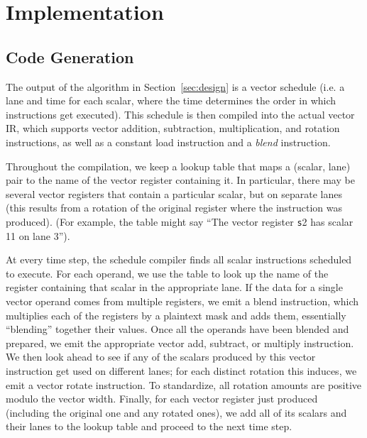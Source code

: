 \section{Implementation}\label{sec:implementation}
\subsection{Code Generation}
The output of the algorithm in Section~\ref{sec:design} is a vector schedule (i.e. a lane and time for each scalar, where the time determines the order in which instructions get executed). 
This schedule is then compiled into the actual vector IR, which supports vector addition, subtraction, multiplication, and rotation instructions, as well as a constant load instruction and a {\em blend} instruction.

Throughout the compilation, we keep a lookup table that maps a (scalar, lane) pair to the name of the vector register containing it.
In particular, there may be several vector registers that contain a particular scalar, but on separate lanes (this results from a rotation of the original register where the instruction was produced).
(For example, the table might say ``The vector register {\texttt s2} has scalar 11 on lane 3'').

At every time step, the schedule compiler finds all scalar instructions scheduled to execute.
For each operand, we use the table to look up the name of the register containing that scalar in the appropriate lane.
If the data for a single vector operand comes from multiple registers, we emit a blend instruction, which multiplies each of the registers by a plaintext mask and adds them, essentially ``blending'' together their values.
Once all the operands have been blended and prepared, we emit the appropriate vector add, subtract, or multiply instruction.
We then look ahead to see if any of the scalars produced by this vector instruction get used on different lanes; for each distinct rotation this induces, we emit a vector rotate instruction.
To standardize, all rotation amounts are positive modulo the vector width.
Finally, for each vector register just produced (including the original one and any rotated ones), we add all of its scalars and their lanes to the lookup table and proceed to the next time step.

